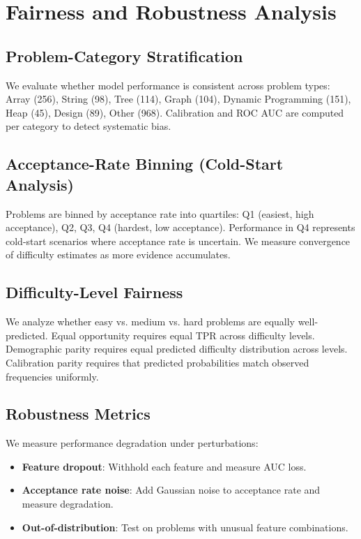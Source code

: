 \documentclass[conference]{IEEEtran}
\begin{document}
\section{Fairness and Robustness Analysis}

\subsection{Problem-Category Stratification}
We evaluate whether model performance is consistent across problem types: Array (256), String (98), Tree (114), Graph (104), Dynamic Programming (151), Heap (45), Design (89), Other (968). Calibration and ROC AUC are computed per category to detect systematic bias.

\subsection{Acceptance-Rate Binning (Cold-Start Analysis)}
Problems are binned by acceptance rate into quartiles: Q1 (easiest, high acceptance), Q2, Q3, Q4 (hardest, low acceptance). Performance in Q4 represents cold-start scenarios where acceptance rate is uncertain. We measure convergence of difficulty estimates as more evidence accumulates.

\subsection{Difficulty-Level Fairness}
We analyze whether easy vs. medium vs. hard problems are equally well-predicted. Equal opportunity requires equal TPR across difficulty levels. Demographic parity requires equal predicted difficulty distribution across levels. Calibration parity requires that predicted probabilities match observed frequencies uniformly.

\subsection{Robustness Metrics}
We measure performance degradation under perturbations:
\begin{itemize}
    \item \textbf{Feature dropout}: Withhold each feature and measure AUC loss.
    \item \textbf{Acceptance rate noise}: Add Gaussian noise to acceptance rate and measure degradation.
    \item \textbf{Out-of-distribution}: Test on problems with unusual feature combinations.
\end{itemize}
\end{document}
